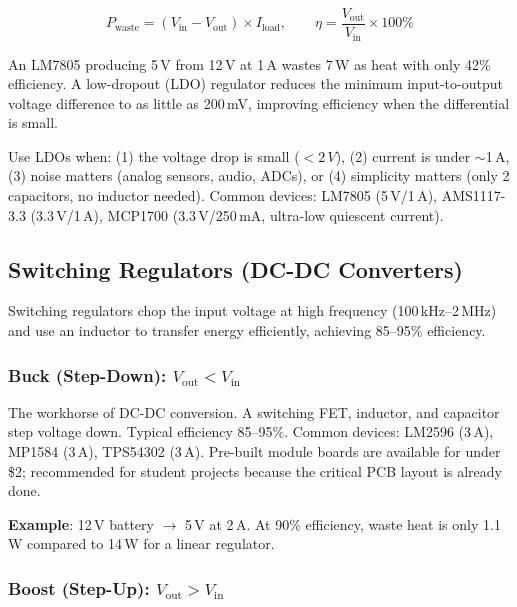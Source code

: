 \begin{equation}
  P_{\text{waste}} = (V_{\text{in}} - V_{\text{out}}) \times I_{\text{load}}, \qquad \eta = \frac{V_{\text{out}}}{V_{\text{in}}} \times 100\%
\end{equation}

An LM7805 producing 5\,V from 12\,V at 1\,A wastes 7\,W as heat with only 42\% efficiency. A low-dropout (LDO) regulator reduces the minimum input-to-output voltage difference to as little as 200\,mV, improving efficiency when the differential is small.

\begin{tipbox}
Use LDOs when: (1) the voltage drop is small ($<2\,V$), (2) current is under $\sim$1\,A, (3) noise matters (analog sensors, audio, ADCs), or (4) simplicity matters (only 2 capacitors, no inductor needed). Common devices: LM7805 (5\,V/1\,A), AMS1117-3.3 (3.3\,V/1\,A), MCP1700 (3.3\,V/250\,mA, ultra-low quiescent current).
\end{tipbox}

\subsection{Switching Regulators (DC-DC Converters)}

Switching regulators chop the input voltage at high frequency (100\,kHz--2\,MHz) and use an inductor to transfer energy efficiently, achieving 85--95\% efficiency.

\subsubsection{Buck (Step-Down): $V_{\text{out}} < V_{\text{in}}$}

The workhorse of DC-DC conversion. A switching FET, inductor, and capacitor step voltage down. Typical efficiency 85--95\%. Common devices: LM2596 (3\,A), MP1584 (3\,A), TPS54302 (3\,A). Pre-built module boards are available for under \$2; recommended for student projects because the critical PCB layout is already done.

\textbf{Example}: 12\,V battery $\to$ 5\,V at 2\,A. At 90\% efficiency, waste heat is only 1.1\,W compared to 14\,W for a linear regulator.

\subsubsection{Boost (Step-Up): $V_{\text{out}} > V_{\text{in}}$}

